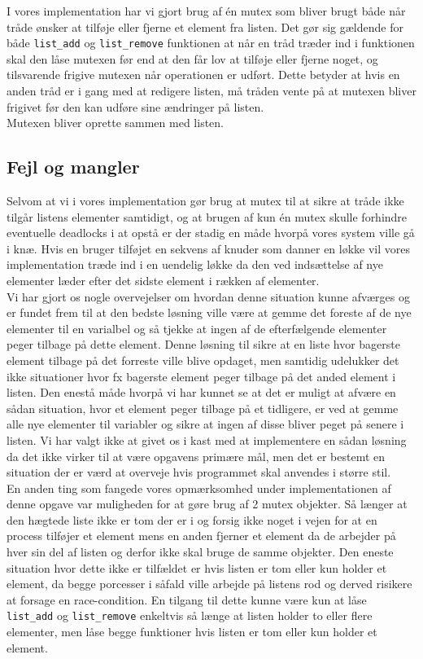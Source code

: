 \documentclass[main.tex]{subfile}
\begin{document}
I vores implementation har vi gjort brug af én mutex som bliver brugt både når tråde ønsker at tilføje eller fjerne et element fra listen. Det gør sig gældende for både \texttt{list\_add} og \texttt{list\_remove} funktionen at når en tråd træder ind i funktionen skal den låse mutexen før end at den får lov at tilføje eller fjerne noget, og tilsvarende frigive mutexen når operationen er udført. Dette betyder at hvis en anden tråd er i gang med at redigere listen, må tråden vente på at mutexen bliver frigivet før den kan udføre sine ændringer på listen.\\

Mutexen bliver oprette sammen med listen.

\subsection{Fejl og mangler}
Selvom at vi i vores implementation gør brug at mutex til at sikre at tråde ikke tilgår listens elementer samtidigt, og at brugen af kun én mutex skulle forhindre eventuelle deadlocks i at opstå er der stadig en måde hvorpå vores system ville gå i knæ. Hvis en bruger tilføjet en sekvens af knuder som danner en løkke vil vores implementation træde ind i en uendelig løkke da den ved indsættelse af nye elementer læder efter det sidste element i rækken af elementer.\\

Vi har gjort os nogle overvejelser om hvordan denne situation kunne afværges og er fundet frem til at den bedste løsning ville være at gemme det foreste af de nye elementer til en varialbel og så tjekke at ingen af de efterfælgende elementer peger tilbage på dette element. Denne løsning til sikre at en liste hvor bagerste element tilbage på det forreste ville blive opdaget, men samtidig udelukker det ikke situationer hvor fx bagerste element peger tilbage på det anded element i listen. Den enestå måde hvorpå vi har kunnet se at det er muligt at afvære en sådan situation, hvor et element peger tilbage på et tidligere, er ved at gemme alle nye elementer til variabler og sikre at ingen af disse bliver peget på senere i listen. Vi har valgt ikke at givet os i kast med at implementere en sådan løsning da det ikke virker til at være opgavens primære mål, men det er bestemt en situation der er værd at overveje hvis programmet skal anvendes i større stil.\\

En anden ting som fangede vores opmærksomhed under implementationen af denne opgave var muligheden for at gøre brug af 2 mutex objekter. Så længer at den hægtede liste ikke er tom der er i og forsig ikke noget i vejen for at en process tilføjer et element mens en anden fjerner et element da de arbejder på hver sin del af listen og derfor ikke skal bruge de samme objekter. Den eneste situation hvor dette ikke er tilfældet er hvis listen er tom eller kun holder et element, da begge porcesser i såfald ville arbejde på listens rod og derved risikere at forsage en race-condition. En tilgang til dette kunne være kun at låse \texttt{list\_add} og \texttt{list\_remove} enkeltvis så længe at listen holder to eller flere elementer, men låse begge funktioner hvis listen er tom eller kun holder et element.
\end{document}
